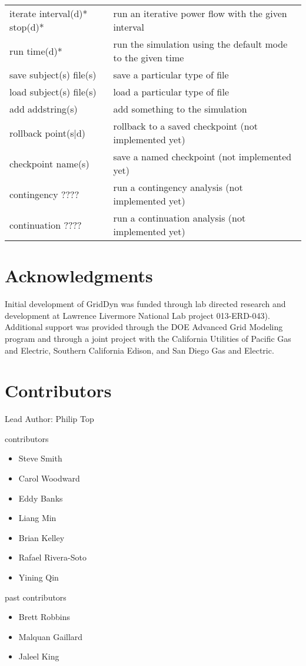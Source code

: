 \documentclass[12pt]{article} %
\begin{document}
\begin{table}[ht]
\begin{tabular}{l p{7cm}}
    iterate interval(d)* stop(d)* &  run an iterative power flow with the given interval \\
    run time(d)* &     run the simulation using the default mode to the given time \\
    save subject(s) file(s) & save a particular type of file \\
    load subject(s) file(s) & load  a particular type of file \\
    add addstring(s) & add something to the simulation  \\
    rollback point(s|d)  & rollback to a saved checkpoint (not implemented yet) \\
    checkpoint name(s) &  save a named checkpoint (not implemented yet) \\
    contingency ????  &  run a contingency analysis (not implemented yet) \\
    continuation ???? & run a continuation analysis (not implemented yet) \\


        \hline %
    \end{tabular}
    \label{table:actions}
\end{table}

\section{Acknowledgments}
Initial development of GridDyn was funded through lab directed research and development at Lawrence Livermore National Lab project 013-ERD-043).  Additional support was provided through the DOE Advanced Grid Modeling program and through a joint project with the California Utilities of Pacific Gas and Electric, Southern California Edison, and San Diego Gas and Electric.

\clearpage

\section{Contributors}
Lead Author: Philip Top

contributors
\begin{itemize}
    \item Steve Smith
    \item Carol Woodward
    \item Eddy Banks
    \item Liang Min
    \item Brian Kelley
    \item Rafael Rivera-Soto
    \item Yining Qin
\end{itemize}
past contributors
\begin{itemize}
    \item Brett Robbins
    \item Malquan Gaillard
    \item Jaleel King

\end{itemize}
\end{document}
